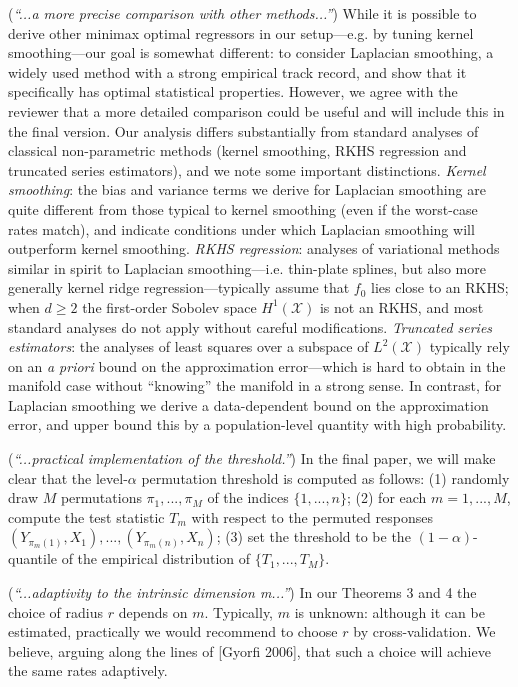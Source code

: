 \documentclass{article}
\begin{document}
(\textit{“...a more precise comparison with other methods...”}) While it is possible to derive other minimax optimal regressors in our setup---e.g. by tuning kernel smoothing---our goal is somewhat different: to consider Laplacian smoothing, a widely used method with a strong empirical track record, and show that it specifically has optimal statistical properties. However, we agree with the reviewer that a more detailed comparison could be useful and will include this in the final version. Our analysis differs substantially from standard analyses of classical non-parametric methods (kernel smoothing, RKHS regression and truncated series estimators), and we note some important distinctions. \textit{Kernel smoothing}: the bias and variance terms we derive for Laplacian smoothing are quite different from those typical to kernel smoothing (even if the worst-case rates match), and indicate conditions under which Laplacian smoothing will outperform kernel smoothing. \textit{RKHS regression}: analyses of variational methods similar in spirit to Laplacian smoothing---i.e. thin-plate splines, but also more generally kernel ridge regression---typically assume that $f_0$ lies close to an RKHS; when $d \geq 2$ the first-order Sobolev space $H^{1}(\mathcal{X})$ is not an RKHS, and most standard analyses do not apply without careful modifications. \textit{Truncated series estimators}: the analyses of least squares over a subspace of $L^2(\mathcal{X})$ typically rely on an \textit{a priori} bound on the approximation error---which is hard to obtain in the manifold case without “knowing” the manifold in a strong sense.  In contrast, for Laplacian smoothing we derive a data-dependent bound on the approximation error, and upper bound this by a population-level quantity with high probability.  

(\textit{“...practical implementation of the threshold.”}) In the final paper, we will make clear that the level-$\alpha$ permutation threshold is computed as follows: (1) randomly draw $M$ permutations $\pi_1,...,\pi_M$ of the indices $\{1,...,n\}$; (2) for each $m = 1,...,M$, compute the test statistic $T_m$ with respect to the permuted responses $(Y_{\pi_m(1)},X_1),...,(Y_{\pi_m(n)},X_n)$; (3) set the threshold to be the $(1 - \alpha)$-quantile of the empirical distribution of $\{T_1,...,T_M\}$.

(\textit{“...adaptivity to the intrinsic dimension m...”}) In our Theorems 3 and 4 the choice of radius $r$ depends on $m$. Typically, $m$ is unknown: although it can be estimated, practically we would recommend to choose $r$ by cross-validation. We believe, arguing along the lines of [Gyorfi 2006], that such a choice will achieve the same rates adaptively.
\end{document}
